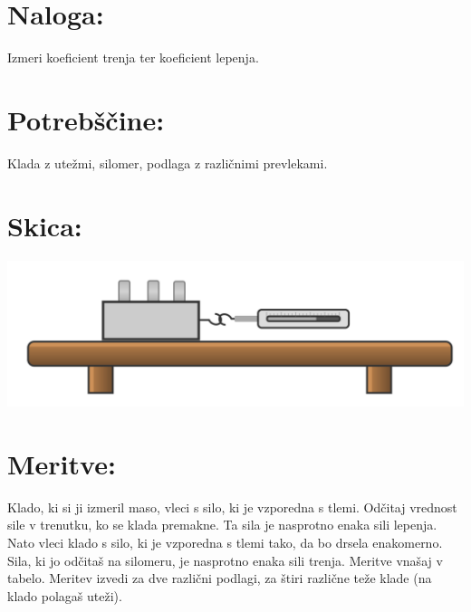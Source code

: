 \documentclass[a4paper]{article}
\begin{document}



\section*{Naloga:} %
Izmeri koeficient trenja ter koeficient lepenja.

\section*{Potrebščine:}

Klada z utežmi, silomer, podlaga z različnimi prevlekami.

\section*{Skica:}

\includegraphics[scale=0.5]{skica.png}

\section*{Meritve:}

Klado, ki si ji izmeril maso, vleci s silo, ki je vzporedna s tlemi. Odčitaj vrednost sile v trenutku, ko se klada premakne. Ta sila je nasprotno enaka sili lepenja. Nato vleci klado s silo, ki je vzporedna s tlemi tako, da bo drsela enakomerno. Sila, ki jo  odčitaš na silomeru, je nasprotno enaka sili trenja. Meritve vnašaj v tabelo. Meritev izvedi za dve različni podlagi, za štiri različne teže klade (na klado polagaš uteži).
\end{document}
